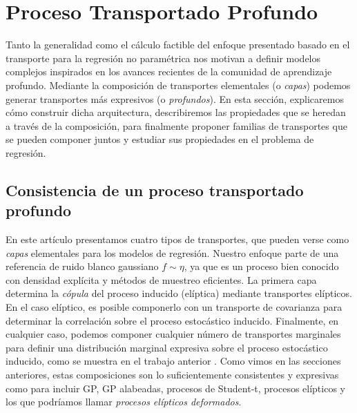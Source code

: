 \section{Proceso Transportado Profundo}
\label{sec:computationtgp}
Tanto la generalidad como el cálculo factible del enfoque presentado basado en el transporte para la regresión no paramétrica nos motivan a definir modelos complejos inspirados en los avances recientes de la comunidad de aprendizaje profundo. Mediante la composición de transportes elementales (o \emph{capas}) podemos generar transportes más expresivos (o \emph{profundos}). En esta sección, explicaremos cómo construir dicha arquitectura, describiremos las propiedades que se heredan a través de la composición, para finalmente proponer familias de transportes que se pueden componer juntos y estudiar sus propiedades en el problema de regresión.



\subsection{Consistencia de un proceso transportado profundo}

En este artículo presentamos cuatro tipos de transportes, que pueden verse como \emph{capas} elementales para los modelos de regresión. Nuestro enfoque parte de una referencia de ruido blanco gaussiano \(f \sim \eta\), ya que es un proceso bien conocido con densidad explícita y métodos de muestreo eficientes. La primera capa determina la \emph{cópula} del proceso inducido (elíptica) mediante transportes elípticos. En el caso elíptico, es posible componerlo con un transporte de covarianza para determinar la correlación sobre el proceso estocástico inducido. Finalmente, en cualquier caso, podemos componer cualquier número de transportes marginales para definir una distribución marginal expresiva sobre el proceso estocástico inducido, como se muestra en el trabajo anterior \cite{cwgp}. Como vimos en las secciones anteriores, estas composiciones son lo suficientemente consistentes y expresivas como para incluir GP, GP alabeadas, procesos de Student-t, procesos elípticos y los que podríamos llamar \emph{procesos elípticos deformados}.


